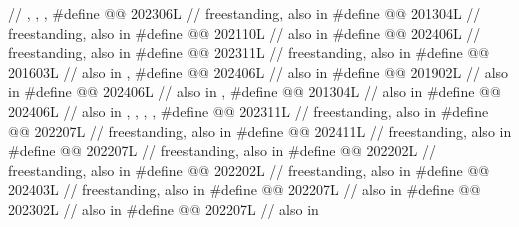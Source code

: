 \begin{codeblock}
  // , , , 
#define @@                            202306L // freestanding, also in 
#define @@                    201304L // freestanding, also in 
#define @@                          202110L // also in 
#define @@            202406L // freestanding, also in 
#define @@                           202311L // freestanding, also in 
#define @@                201603L // also in , 
#define @@                     202406L // also in 
#define @@             201902L // also in 
#define @@                             202406L // also in , 
#define @@                  201304L // also in 
#define @@                            202406L
  // also in , , , , 
#define @@                   202311L // freestanding, also in 
#define @@                  202207L // freestanding, also in 
#define @@               202411L // freestanding, also in 
#define @@          202207L // freestanding, also in 
#define @@                      202202L // freestanding, also in 
#define @@                   202202L // freestanding, also in 
#define @@                     202403L // freestanding, also in 
#define @@                   202207L // also in 
#define @@                  202302L // also in 
#define @@                  202207L // also in 

\end{codeblock}

